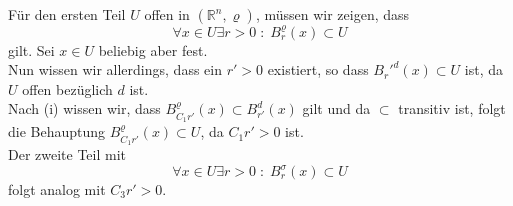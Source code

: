 Für den ersten Teil $U$ offen in $(\mathbb{R}^n, \varrho)$, müssen wir zeigen, dass
$$
    \forall x \in U \exists r > 0 \; : \; B_r^\varrho (x) \subset U
$$
gilt. Sei $x \in U$ beliebig aber fest.\\
Nun wissen wir allerdings, dass ein $r' > 0$ existiert, so dass $B_r'^d (x) \subset U$ ist,
da $U$ offen bezüglich $d$ ist.\\
Nach (i) wissen wir, dass $B_{C_1r'}^\varrho (x) \subset B_{r'}^d (x)$ gilt und da $\subset$ transitiv ist,
folgt die Behauptung $B_{C_1r'}^\varrho (x) \subset U$, da $C_1r' > 0$ ist.\\

Der zweite Teil mit
$$
    \forall x \in U \exists r > 0 \; : \; B_r^\sigma (x) \subset U
$$
folgt analog mit $C_3r' > 0$.

